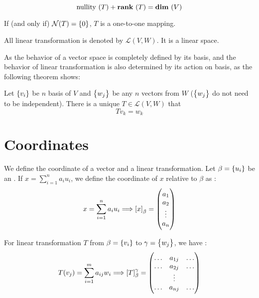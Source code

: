 \begin{theorem}
    \begin{equation}
        \text{nullity }(T) + \rank{T} = \dimension{V}
    \end{equation}
\end{theorem}


If (and only if) $\nullspace{T} = \set{0}$, $T$ is a one-to-one mapping.


\begin{theorem}
    All linear transformation is denoted by $\mathcal {L}(V,W)$. It is a linear space.
\end{theorem}


As the behavior of a vector space is completely defined by its basis, and the behavior of linear transformation is also determined by its action on basis, as the following theorem shows:
\begin{theorem}    
    Let $\set{v_i}$ be $n$ basis of $V$ and $\set{w_j}$ be any $n$ vectors from $W$ ($\set{w_j}$ do not need to be independent). There is a unique $T \in \mathcal{L}(V,W)$ that
    \begin{equation}
        T v_k = w_k
    \end{equation}
\end{theorem}






\section{Coordinates}

We define the coordinate of a vector and a linear transformation. Let $\beta = \set{u_i}$ be an . If $\displaystyle x = \sum_{i=1}^n a_i u_i$, we define the coordinate of $x$ relative to $\beta$ as :
\begin{equation}
    x = \sum_{i=1}^n a_i u_i \Longrightarrow \coordinate{x}_\beta = \begin{pmatrix}
        a_1 \\
        a_2 \\
        \vdots \\
        a_n
    \end{pmatrix}
\end{equation}

For linear transformation $T$ from $\beta = \set{v_i} $ to $\gamma = \set{w_j}$, we have :
\begin{equation}
    T(v_j) = \sum_{i=1}^m a_{ij} w_i \Longrightarrow \coordinate{T}_{\beta}^{\gamma} = \begin{pmatrix}
        \hdots & a_{1j} & \hdots \\
        \hdots & a_{2j} & \hdots \\
        & \vdots \\
        \hdots & a_{nj} & \hdots \\
    \end{pmatrix}
\end{equation}

